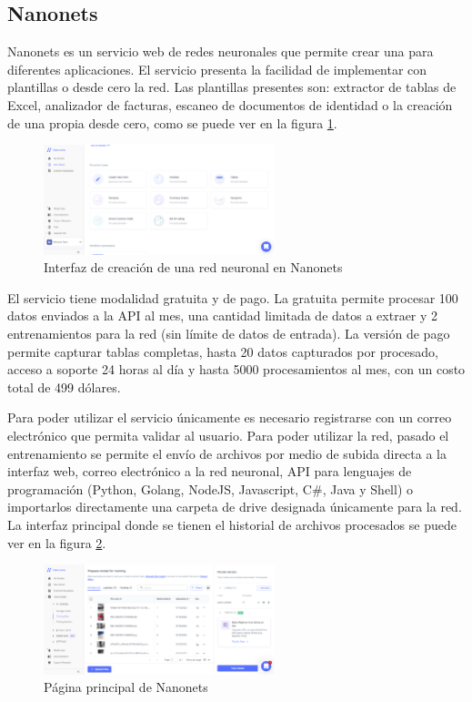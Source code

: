 \subsection{Nanonets}
Nanonets es un servicio web de redes neuronales que permite crear una para diferentes aplicaciones. El servicio presenta la facilidad de implementar con plantillas o desde cero la red. Las plantillas presentes son: extractor de tablas de Excel, analizador de facturas, escaneo de documentos de identidad o la creación de una propia desde cero, como se puede ver en la figura \ref{nanonets1}.
\begin{figure}[h!]
    \centering
    \includegraphics[width=0.6\textwidth]{imagenes/marco teorico/nanonets_create.png}
    \caption{Interfaz de creación de una red neuronal en Nanonets}
    \label{nanonets1}
\end{figure}
\par
El servicio tiene modalidad gratuita y de pago. La gratuita permite procesar 100 datos enviados a la API al mes, una cantidad limitada de datos a extraer y 2 entrenamientos para la red (sin límite de datos de entrada). La versión de pago permite capturar tablas completas, hasta 20 datos capturados por procesado, acceso a soporte 24 horas al día y hasta 5000 procesamientos al mes, con un costo total de 499 dólares.
\par
Para poder utilizar el servicio únicamente es necesario registrarse con un correo electrónico que permita validar al usuario. Para poder utilizar la red, pasado el entrenamiento se permite el envío de archivos por medio de subida directa a la interfaz web, correo electrónico a la red neuronal, API para lenguajes de programación (Python, Golang, NodeJS, Javascript, C\#, Java y Shell) o importarlos directamente una carpeta de drive designada únicamente para la red. La interfaz principal donde se tienen el historial de archivos procesados se puede ver en la figura \ref{nanonets2}.
\begin{figure}[h!]
    \centering
    \includegraphics[width=0.6\textwidth]{imagenes/marco teorico/nanonets2.png}
    \caption{Página principal de Nanonets}
    \label{nanonets2}
\end{figure}




